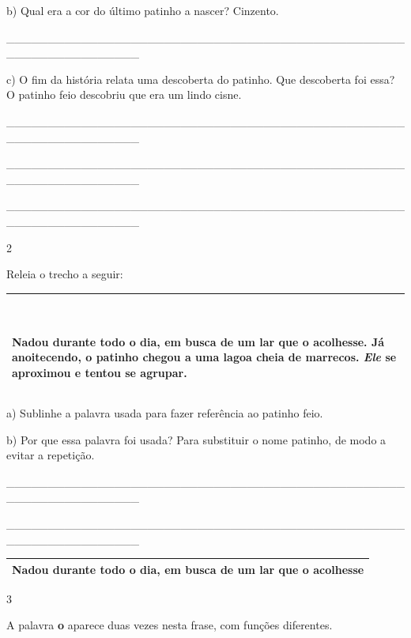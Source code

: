 \begin{escolha}
\begin{escolha}
{b) Qual era a cor do último patinho a nascer? Cinzento.

\_\_\_\_\_\_\_\_\_\_\_\_\_\_\_\_\_\_\_\_\_\_\_\_\_\_\_\_\_\_\_\_\_\_\_\_\_\_\_\_\_\_\_\_\_\_\_\_\_\_\_\_\_\_\_\_\_\_\_\_\_\_\_\_

c) O fim da história relata uma descoberta do patinho. Que descoberta
foi essa? O patinho feio descobriu que era um lindo cisne.

\_\_\_\_\_\_\_\_\_\_\_\_\_\_\_\_\_\_\_\_\_\_\_\_\_\_\_\_\_\_\_\_\_\_\_\_\_\_\_\_\_\_\_\_\_\_\_\_\_\_\_\_\_\_\_\_\_\_\_\_\_\_\_\_

\protect\hypertarget{_Hlk130128820}{}{}\_\_\_\_\_\_\_\_\_\_\_\_\_\_\_\_\_\_\_\_\_\_\_\_\_\_\_\_\_\_\_\_\_\_\_\_\_\_\_\_\_\_\_\_\_\_\_\_\_\_\_\_\_\_\_\_\_\_\_\_\_\_\_\_

\_\_\_\_\_\_\_\_\_\_\_\_\_\_\_\_\_\_\_\_\_\_\_\_\_\_\_\_\_\_\_\_\_\_\_\_\_\_\_\_\_\_\_\_\_\_\_\_\_\_\_\_\_\_\_\_\_\_\_\_\_\_\_\_

\num{2}

Releia o trecho a seguir:

\begin{longtable}[]{@{}l@{}}
\toprule
\begin{minipage}[t]{0.97\columnwidth}\raggedright\strut
~ ~

Nadou durante todo o dia, em busca de um lar que o acolhesse. Já
anoitecendo, o patinho chegou a uma lagoa cheia de marrecos. \emph{Ele}
se aproximou e tentou se agrupar.\strut
\end{minipage}\tabularnewline
\bottomrule
\end{longtable}

a) Sublinhe a palavra usada para fazer referência ao patinho feio.

b) Por que essa palavra foi usada? Para substituir o nome patinho, de
modo a evitar a repetição.

\_\_\_\_\_\_\_\_\_\_\_\_\_\_\_\_\_\_\_\_\_\_\_\_\_\_\_\_\_\_\_\_\_\_\_\_\_\_\_\_\_\_\_\_\_\_\_\_\_\_\_\_\_\_\_\_\_\_\_\_\_\_\_\_

\_\_\_\_\_\_\_\_\_\_\_\_\_\_\_\_\_\_\_\_\_\_\_\_\_\_\_\_\_\_\_\_\_\_\_\_\_\_\_\_\_\_\_\_\_\_\_\_\_\_\_\_\_\_\_\_\_\_\_\_\_\_\_\_

\begin{longtable}[]{@{}l@{}}
\toprule
Nadou durante todo o dia, em busca de um lar que o
acolhesse\tabularnewline
\bottomrule
\end{longtable}

\num{3}

A palavra \textbf{o} aparece duas vezes nesta frase, com funções
diferentes.

}
\end{escolha}
\end{escolha}
